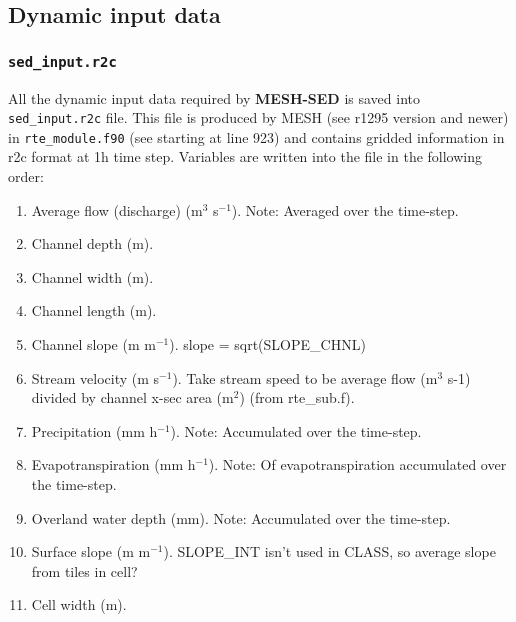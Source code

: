 \documentclass{beamer}
\newcommand{\ms}{\textbf{MESH-SED} }
\begin{document}
\begin{frame}
\end{frame}

\subsection{Dynamic input data}
\begin{frame}\frametitle{\texttt{sed\_input.r2c}}
All the dynamic input data required by \ms is saved into \texttt{sed\_input.r2c} file. This file is produced by MESH (see r1295 version and newer) in \texttt{rte\_module.f90} (see starting at line 923) and contains gridded information in r2c format at 1h time step. Variables are written into the file in the following order: 
{\scriptsize
\begin{enumerate}
\item Average flow (discharge) (m$^{3}$ s$^{-1}$). Note: Averaged over the time-step.
\item Channel depth (m).
\item Channel width (m).
\item Channel length (m).
\item Channel slope (m m$^{-1}$). slope = sqrt(SLOPE\_CHNL)
\item Stream velocity (m s$^{-1}$). Take stream speed to be average flow (m$^{3}$ s-1) divided by channel x-sec area (m$^{2}$) (from rte\_sub.f).
\item Precipitation (mm h$^{-1}$). Note: Accumulated over the time-step.
\item Evapotranspiration (mm h$^{-1}$). Note: Of evapotranspiration accumulated over the time-step.
\item Overland water depth (mm). Note: Accumulated over the time-step.
\item Surface slope (m m$^{-1}$). SLOPE\_INT isn't used in CLASS, so average slope from tiles in cell?
\item Cell width (m).
\end{enumerate}
}
\end{frame}
\end{document}
